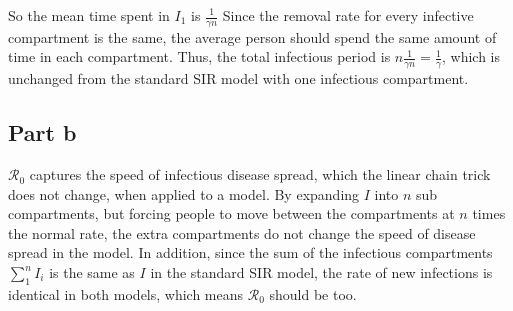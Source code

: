 \documentclass[12pt]{article}
\newcommand{\R}{{\mathcal R}}
\begin{document}
So the mean time spent in $I_1$ is $\frac{1}{\gamma n}$ Since the removal rate for every infective compartment is the same, the average person should spend the same amount of time in each compartment. Thus, the total infectious period is $n \frac{1}{\gamma n} = \frac{1}{\gamma}$, which is unchanged from the standard SIR model with one infectious compartment.

\subsection*{Part b}

$\R_0$ captures the speed of infectious disease spread, which the linear chain trick does not change, when applied to a model. By expanding $I$ into $n$ sub compartments, but forcing people to move between the compartments at $n$ times the normal rate, the extra compartments do not change the speed of disease spread in the model. In addition, since the sum of the infectious compartments $\sum_1^n{I_i}$ is the same as $I$ in the standard SIR model, the rate of new infections is identical in both models, which means $\R_0$ should be too.
\end{document}
